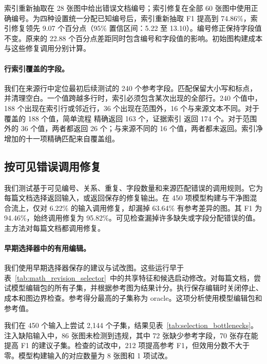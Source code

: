 索引重新抽取在 28 张图中给出错误文档编号；索引修复在全部 60 张图中使用正确编号。为四种设置统一分配已知编号后，索引重新抽取 F1 提高到 74.86\%，索引修复领先 9.07 个百分点（95\% 置信区间：5.22 至 13.10）。编号修正保持字段值不变。原来的 22.88 个百分点差距同时包含编号和字段值的影响。初始图构建成本与这些修复调用分别计算。

\paragraph{行索引覆盖的字段。}

我们在来源行中定位最初后续测试的 240 个参考字段。匹配保留大小写和标点，并清理空白。一个值跨越多行时，索引必须包含某次出现的全部行。240 个值中，188 个出现在索引行或邻近行，36 个出现在范围外，16 个与来源文本不同。对于覆盖的 188 个值，简单流程 精确返回 163 个，证据索引 返回 174 个。对于范围外的 36 个值，两者都返回 26 个；与来源不同的 16 个值，两者都未返回。索引净增加的十一项精确匹配来自覆盖组。

\subsection{按可见错误调用修复}
\label{app:call_policy}

我们测试基于可见编号、关系、重复、字段数量和来源匹配错误的调用规则。它为每篇文档选择返回输入，或返回保存的修复输出。在 450 项模型构建与干净图混合流上，仅对 6.22\% 的输入调用修复，却漏掉 63.64\% 有参考差异的图。其 F1 为 94.46\%，始终调用修复为 95.82\%。可见检查漏掉许多缺失或字段分配错误的值。主方法对每篇文档都调用修复。

\paragraph{早期选择器中的有用编辑。}

我们使用早期选择器保存的建议与试改图。这些运行早于表~\ref{tab:math_revision_selector}~中的共享特征和候选启动修改。对每篇文档，尝试模型编辑包的所有子集，并根据参考图为结果计分。执行保存编辑时关闭停止、成本和图边界检查。参考得分最高的子集称为 oracle。这项分析使用模型编辑包和参考值。

我们在 450 个输入上尝试 2,144 个子集，结果见表~\ref{tab:selection_bottlenecks}。注入缺陷输入中，86 张图未检测到违规，其中 72 张缺少参考字段，70 张存在能提高 F1 的建议子集。检查的试改中，212 项提高参考 F1，但效用分数不大于零。模型构建输入的对应数量为 8 张图和 1 项试改。

